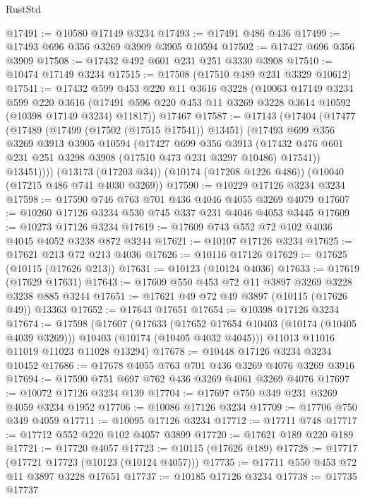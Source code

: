 \begin{lexlean}{RustStd}
\begin{coremodule}
@17491 := @10580 @17149 @3234
@17493 := @17491 @486 @436
@17499 := @17493 @696 @356 @3269 @3909 @3905 @10594
@17502 := @17427 @696 @356 @3909
@17508 := @17432 @492 @601 @231 @251 @3330 @3908
@17510 := @10474 @17149 @3234
@17515 := @17508 (@17510 @489 @231 @3329 @10612)
@17541 := @17432
    @599
    @453
    @220
    @11
    @3616
    @3228
    (@10063
      @17149
      @3234
      @599
      @220
      @3616
      (@17491 @596 @220 @453 @11 @3269 @3228 @3614 @10592 (@10398 @17149 @3234) @11817))
    @17467
@17587 := @17143
    (@17404
      (@17477
        (@17489
          (@17499 (@17502 (@17515 @17541)) @13451)
          (@17493
            @699
            @356
            @3269
            @3913
            @3905
            @10594
            (@17427
              @699
              @356
              @3913
              (@17432 @476 @601 @231 @251 @3298 @3908 (@17510 @473 @231 @3297 @10486) @17541))
            @13451))))
    (@13173 (@17203 @34))
    (@10174 (@17208 @1226 @486))
    (@10040 (@17215 @486 @741 @4030 @3269))
@17590 := @10229 @17126 @3234 @3234
@17598 := @17590 @746 @763 @701 @436 @4046 @4055 @3269 @4079
@17607 := @10260 @17126 @3234 @530 @745 @337 @231 @4046 @4053 @3445
@17609 := @10273 @17126 @3234
@17619 := @17609 @743 @552 @72 @102 @4036 @4045 @4052 @3238 @872 @3244
@17621 := @10107 @17126 @3234
@17625 := @17621 @213 @72 @213 @4036
@17626 := @10116 @17126
@17629 := @17625 (@10115 (@17626 @213))
@17631 := @10123 (@10124 @4036)
@17633 := @17619 (@17629 @17631)
@17643 := @17609 @550 @453 @72 @11 @3897 @3269 @3228 @3238 @885 @3244
@17651 := @17621 @49 @72 @49 @3897 (@10115 (@17626 @49)) @13363
@17652 := @17643 @17651
@17654 := @10398 @17126 @3234
@17674 := @17598
    (@17607
      (@17633
        (@17652 @17654 @10403 (@10174 (@10405 @4039 @3269)))
        @10403
        (@10174 (@10405 @4032 @4045)))
      @11013
      @11016
      @11019
      @11023
      @11028
      @13294)
@17678 := @10448 @17126 @3234 @3234 @10452
@17686 := @17678 @4055 @763 @701 @436 @3269 @4076 @3269 @3916
@17694 := @17590 @751 @697 @762 @436 @3269 @4061 @3269 @4076
@17697 := @10072 @17126 @3234 @139
@17704 := @17697 @750 @349 @231 @3269 @4059 @3234 @1952
@17706 := @10086 @17126 @3234
@17709 := @17706 @750 @349 @4059
@17711 := @10095 @17126 @3234
@17712 := @17711 @748
@17717 := @17712 @552 @220 @102 @4057 @3899
@17720 := @17621 @189 @220 @189
@17721 := @17720 @4057
@17723 := @10115 (@17626 @189)
@17728 := @17717 (@17721 @17723 (@10123 (@10124 @4057)))
@17735 := @17711 @550 @453 @72 @11 @3897 @3228 @17651
@17737 := @10185 @17126 @3234
@17738 := @17735 @17737

\end{coremodule}
\end{lexlean}
